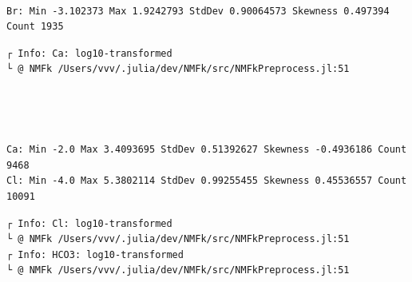 \documentclass[11pt]{article}
\begin{document}
    \begin{center}
    \end{center}
    { \hspace*{\fill} \\}
    
    \begin{Verbatim}[commandchars=\\\{\}]
Br: Min -3.102373 Max 1.9242793 StdDev 0.90064573 Skewness 0.497394 Count 1935
    \end{Verbatim}

    \begin{Verbatim}[commandchars=\\\{\}]
┌ Info: Ca: log10-transformed
└ @ NMFk /Users/vvv/.julia/dev/NMFk/src/NMFkPreprocess.jl:51
    \end{Verbatim}

    \begin{center}
    \end{center}
    { \hspace*{\fill} \\}
    
    \begin{center}
    \end{center}
    { \hspace*{\fill} \\}
    
    \begin{Verbatim}[commandchars=\\\{\}]
Ca: Min -2.0 Max 3.4093695 StdDev 0.51392627 Skewness -0.4936186 Count 9468
Cl: Min -4.0 Max 5.3802114 StdDev 0.99255455 Skewness 0.45536557 Count 10091
    \end{Verbatim}

    \begin{Verbatim}[commandchars=\\\{\}]
┌ Info: Cl: log10-transformed
└ @ NMFk /Users/vvv/.julia/dev/NMFk/src/NMFkPreprocess.jl:51
┌ Info: HCO3: log10-transformed
└ @ NMFk /Users/vvv/.julia/dev/NMFk/src/NMFkPreprocess.jl:51
    \end{Verbatim}

    \begin{center}
    \end{center}
    { \hspace*{\fill} \\}
    
\end{document}
